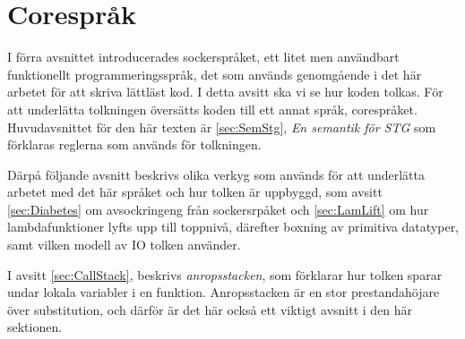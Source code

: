 \documentclass[Rapport]{subfiles}
\begin{document}
\section{Corespråk}


\overviewCore


I förra avsnittet introducerades sockerspråket, ett litet men användbart
funktionellt programmeringsspråk, det som används genomgående i det här
arbetet för att skriva lättläst kod.
    I detta avsitt ska vi se hur koden tolkas. För att underlätta
tolkningen översätts koden till ett annat språk, corespråket. 
Huvudavsnittet för den här texten är \ref{sec:SemStg}, \emph{En semantik för STG}
som förklaras reglerna som används för
tolkningen. 

Därpå följande avsnitt beskrivs olika verkyg som används för att
underlätta arbetet med det här språket och hur tolken är uppbyggd,
som avsitt \ref{sec:Diabetes} om avsockringeng från sockersrpåket och \ref{sec:LamLift} 
om hur lambdafunktioner lyfts upp till toppnivå, därefter
boxning av primitiva datatyper, samt vilken modell av IO tolken använder.

I avsitt \ref{sec:CallStack}, beskrivs \emph{anropsstacken}, som förklarar hur tolken
sparar undar lokala variabler i en funktion. Anropsstacken är en 
stor prestandahöjare över substitution, och därför är det här också ett
viktigt avsnitt i den här sektionen.



%








\end{document}
